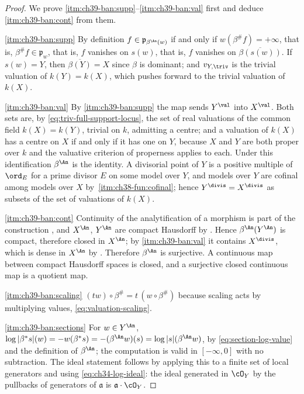 \begin{proof}
We prove \cref{itm:ch39-ban:supp}--\cref{itm:ch39-ban:val} first and deduce
\cref{itm:ch39-ban:cont} from them.

\cref{itm:ch39-ban:supp}  By definition $f\in\mathfrak p_{\beta^{\An}(w)}$
if and only if $w(\beta^{\#}f)=+\infty$, that is,
$\beta^{\#}f\in\mathfrak p_w$, that is, $f$ vanishes on $s(w)$, that
is, $f$ vanishes on $\overline{\beta(s(w))}$.  If $s(w)=Y$, then
$\overline{\beta(Y)}=X$ since $\beta$ is dominant; and
$v_{Y,\triv}$ is the trivial valuation of $k(Y)=k(X)$, which pushes
forward to the trivial valuation of $k(X)$.

\cref{itm:ch39-ban:val}  By \cref{itm:ch39-ban:supp} the map sends
$Y^{\val}$ into $X^{\val}$.  Both sets are, by
\eqref{eq:triv-full-support-locus}, the set of real valuations of the common
field $k(X)=k(Y)$, trivial on $k$, admitting a centre; and a valuation
of $k(X)$ has a centre on $X$ if and only if it has one on $Y$,
because $X$ and $Y$ are both proper over $k$ and the valuative
criterion of properness  applies to
each.  Under this identification $\beta^{\An}$ is the identity.  A
divisorial point of $Y$ is a positive multiple of $\ord_E$ for a prime
divisor $E$ on some model over $Y$, and models over $Y$ are cofinal
among models over $X$ by
\,\cref{itm:ch38-fun:cofinal}; hence
$Y^{\divis}=X^{\divis}$ as subsets of the set of valuations of $k(X)$.

\cref{itm:ch39-ban:cont}  Continuity of the analytification of a morphism is
part of the construction , and
$X^{\An}$, $Y^{\An}$ are compact Hausdorff by
.  Hence
$\beta^{\An}(Y^{\An})$ is compact, therefore closed in $X^{\An}$; by
\cref{itm:ch39-ban:val} it contains $X^{\divis}$, which is dense in
$X^{\An}$ by .  Therefore
$\beta^{\An}$ is surjective.  A continuous map between compact Hausdorff
spaces is closed, and a surjective closed continuous map is a quotient map.

\cref{itm:ch39-ban:scaling}  $(tw)\circ\beta^{\#}=t\,(w\circ\beta^{\#})$
because scaling acts by multiplying values, \eqref{eq:valuation-scaling}.

\cref{itm:ch39-ban:sections}  For $w\in Y^{\An}$,
$\log|\beta^*s|(w)=-w(\beta^*s)=-(\beta^{\An}w)(s)=\log|s|(\beta^{\An}w)$,
by \eqref{eq:section-log-value} and the definition of $\beta^{\An}$; the
computation is valid in $[-\infty,0]$ with no subtraction.  The ideal
statement follows by applying this to a finite set of local generators and
using \eqref{eq:ch34-log-ideal}: the ideal generated in $\cO_Y$ by the
pullbacks of generators of $\mathfrak a$ is $\mathfrak a\cdot\cO_Y$.
\end{proof}

